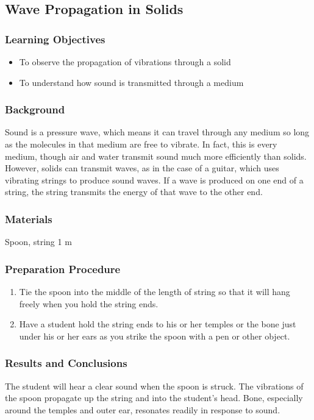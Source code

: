 \subsection{Wave Propagation in Solids}

\subsubsection*{Learning Objectives}
\begin{itemize}
\item{To observe the propagation of vibrations through a solid}
\item{To understand how sound is transmitted through a medium}
\end{itemize}

\subsubsection*{Background}
Sound is a pressure wave, which means it can travel through any medium so long as the molecules in that medium are free to vibrate.  In fact, this is every medium, though air and water transmit sound much more efficiently than solids.  However, solids can transmit waves, as in the case of a guitar, which uses vibrating strings to produce sound waves.
If a wave is produced on one end of a string, the string transmits the energy of that wave to the other end.

\subsubsection*{Materials}
Spoon, string 1 m

\subsubsection*{Preparation Procedure}
\begin{enumerate}
\item{Tie the spoon into the middle of the length of string so that it will hang freely when you hold the string ends.}
\item{Have a student hold the string ends to his or her temples or the bone just under his or her ears as you strike the spoon with a pen or other object.}
\end{enumerate}

\subsubsection*{Results and Conclusions}
The student will hear a clear sound when the spoon is struck.  The vibrations of the spoon propagate up the string and into
the student's head. Bone, especially around the temples and outer ear, resonates readily in response to sound.

